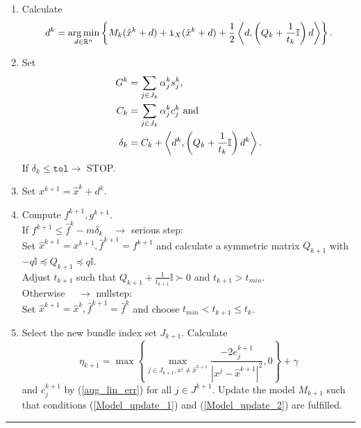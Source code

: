 \begin{enumerate}
	\item Calculate \[d^k = \operatorname*{arg\,min}_{d \in \mathbb{R}^n} \left\{ M_k(\hat{x}^k+d)+\mathtt{i}_X(\hat{x}^k+d)+\frac{1}{2}\left\langle d,\left(Q_k+\frac{1}{t_k}\mathbb{I}\right)d\right\rangle\right\}.\]
	\item Set %
		\begin{align*} 
		  G^k &= \sum_{j \in J_k}{\alpha_j^k s_j^k}, \\ %
			C_k &= \sum_{j \in J_k}{\alpha_j^k c_j^k} \text{ and} \\
	    \delta_k &=  C_k + \Langle d^k,\left(Q_k+\frac{1}{t_k}\mathbb{I}\right)d^k\Rangle.
		\end{align*}
		If \(\delta_k \leq \mathtt{tol} \rightarrow \) STOP.
	\item Set \( x^{k+1} = \hat{x}^k + d^k \).
	\item Compute \(f^{k+1}, g^{k+1}\). \\
	If \(f^{k+1} \leq \hat{f}^k - m\delta_k \quad \rightarrow \) serious step: \\
	\noindent\hspace*{2em}%
	Set \(\hat{x}^{k+1} = x^{k+1}, \hat{f}^{k+1} = {f}^{k+1}\) and calculate a symmetric matrix \(Q_{k+1}\) with \(-q\mathbb{I} \preccurlyeq Q_{k+1} \preccurlyeq q\mathbb{I}\). \\
	Adjust \(t_{k+1}\) such that \(Q_{k+1}+\frac{1}{t_{k+1}}\mathbb{I} \succ 0\) and \(t_{k+1} > t_{min}\).\\
	Otherwise \(\quad \rightarrow\) nullstep: \\
	\noindent\hspace*{2em}%
	Set \(\hat{x}^{k+1} = \hat{x}^k, \hat{f}^{k+1}=\hat{f}^{k}\) and choose \(t_{min} < t_{k+1} \leq t_k\). 	
	\item Select the new bundle index set \(J_{k+1}\). Calculate 
	\[ \eta_{k+1} = \max{\left\{\max_{j \in J_{k+1}, x^j \neq \hat{x}^{k+1}}{\frac{-2e_j^{k+1}}{|x^j - \hat{x}^{k+1}|^2}, 0}\right\}}+\gamma  \]
	and \(c^{k+1}_j \) by (\ref{aug_lin_err}) for all \(j \in J^{k+1}\). Update the model \(M_{k+1}\) such that conditions (\ref{Model_update_1}) and (\ref{Model_update_2}) are fulfilled.
\end{enumerate}
\vspace{1ex}
\hrule

\vspace{1.5em}

